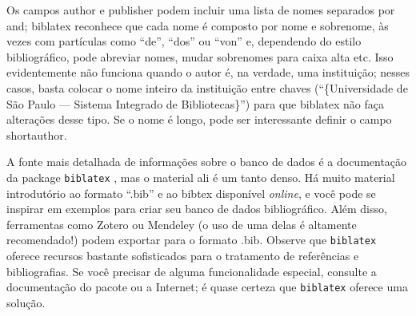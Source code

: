 %
%
%

Os campos \textsf{author} e \textsf{publisher} podem incluir uma lista
de nomes separados por \textsf{and}; biblatex reconhece que cada nome é
composto por nome e sobrenome, às vezes com partículas como ``de'', ``dos''
ou ``von'' e, dependendo do estilo bibliográfico, pode abreviar nomes, mudar
sobrenomes para caixa alta etc. Isso evidentemente não funciona quando o autor
é, na verdade, uma instituição; nesses casos, basta colocar o nome inteiro da
instituição entre chaves (``\{Universidade de São Paulo --- Sistema Integrado
de Bibliotecas\}'') para que biblatex não faça alterações desse tipo. Se o
nome é longo, pode ser interessante definir o campo \textsf{shortauthor}.

A fonte mais detalhada de informações sobre o banco de dados é a documentação
da package \texttt{biblatex} \citep[em especial as seções 2.1.1 e 2.2.2]{biblatex},
mas o material ali é um tanto denso.
Há muito material introdutório ao formato ``.bib'' e ao bibtex disponível
\emph{online}, e você pode se inspirar em exemplos para criar seu banco de
dados bibliográfico. Além disso, ferramentas como Zotero ou
Mendeley (o uso de uma delas é altamente recomendado!)
podem exportar para o formato .bib. Observe que \texttt{biblatex}
 oferece recursos bastante sofisticados para o tratamento de
referências e bibliografias. Se você precisar de alguma funcionalidade
especial, consulte a documentação do pacote ou a Internet; é quase certeza
que \texttt{biblatex} oferece uma solução.


